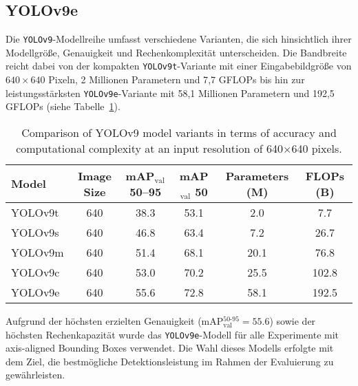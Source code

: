 \subsection{YOLOv9e}

Die \texttt{YOLOv9}-Modellreihe umfasst verschiedene Varianten, die sich hinsichtlich ihrer Modellgröße, Genauigkeit und Rechenkomplexität unterscheiden. Die Bandbreite reicht dabei von der kompakten \texttt{YOLOv9t}-Variante mit einer Eingabebildgröße von $640 \times 640$ Pixeln, 2 Millionen Parametern und 7{,}7 GFLOPs bis hin zur leistungsstärksten \texttt{YOLOv9e}-Variante mit 58{,}1 Millionen Parametern und 192{,}5 GFLOPs (siehe Tabelle~\ref{tab:yolov9-models}).
\begin{table}[h]
\centering
\caption{Comparison of YOLOv9 model variants in terms of accuracy and computational complexity at an input resolution of 640$\times$640 pixels.}
\label{tab:yolov9-models}
\begin{tabular}{l|c|c|c|c|c} %
\textbf{Model} & \textbf{Image Size} & \textbf{mAP$_{\text{val}}$ 50--95} & \textbf{mAP$_{\text{val}}$ 50} & \textbf{Parameters (M)} & \textbf{FLOPs (B)} \\
\hline
YOLOv9t & 640 & 38.3 & 53.1 & 2.0 & 7.7 \\
\hline
YOLOv9s & 640 & 46.8 & 63.4 & 7.2 & 26.7 \\
\hline
YOLOv9m & 640 & 51.4 & 68.1 & 20.1 & 76.8 \\
\hline
YOLOv9c & 640 & 53.0 & 70.2 & 25.5 & 102.8 \\
\hline
YOLOv9e & 640 & 55.6 & 72.8 & 58.1 & 192.5 \\
\end{tabular}
\end{table}



Aufgrund der höchsten erzielten Genauigkeit (mAP$_{\text{val}}^{50\text{-}95} = 55.6$) sowie der höchsten Rechenkapazität wurde das \texttt{YOLOv9e}-Modell für alle Experimente mit axis-aligned Bounding Boxes verwendet. Die Wahl dieses Modells erfolgte mit dem Ziel, die bestmögliche Detektionsleistung im Rahmen der Evaluierung zu gewährleisten.




